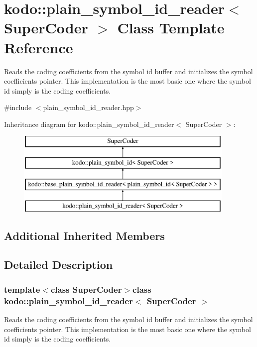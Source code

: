 \hypertarget{classkodo_1_1plain__symbol__id__reader}{\section{kodo\-:\-:plain\-\_\-symbol\-\_\-id\-\_\-reader$<$ Super\-Coder $>$ Class Template Reference}
\label{classkodo_1_1plain__symbol__id__reader}
}


Reads the coding coefficients from the symbol id buffer and initializes the symbol coefficients pointer. This implementation is the most basic one where the symbol id simply is the coding coefficients.  




{\ttfamily \#include $<$plain\-\_\-symbol\-\_\-id\-\_\-reader.\-hpp$>$}

Inheritance diagram for kodo\-:\-:plain\-\_\-symbol\-\_\-id\-\_\-reader$<$ Super\-Coder $>$\-:\begin{figure}[H]
\begin{center}
\leavevmode
\includegraphics[height=4.000000cm]{classkodo_1_1plain__symbol__id__reader}
\end{center}
\end{figure}
\subsection*{Additional Inherited Members}


\subsection{Detailed Description}
\subsubsection*{template$<$class Super\-Coder$>$class kodo\-::plain\-\_\-symbol\-\_\-id\-\_\-reader$<$ Super\-Coder $>$}

Reads the coding coefficients from the symbol id buffer and initializes the symbol coefficients pointer. This implementation is the most basic one where the symbol id simply is the coding coefficients. 

